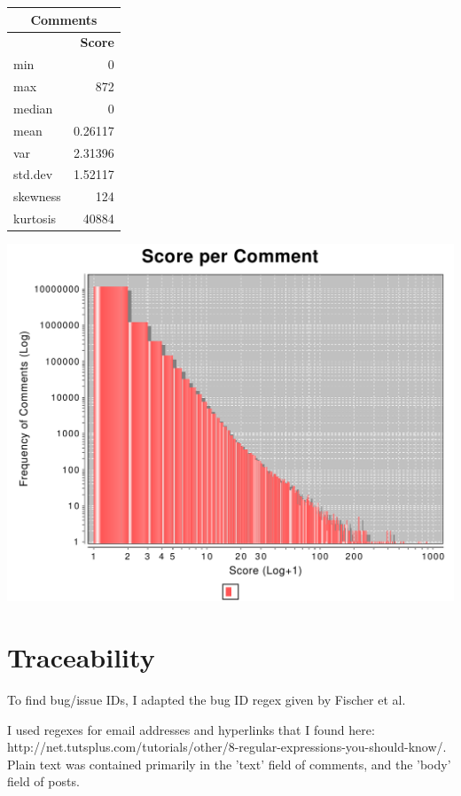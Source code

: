 \documentclass{article}
\begin{document}
\vspace{\baselineskip}

\begin{tabular}[t]{| l | r |} \hline
\multicolumn{2}{|c|}{Comments} \\ \hline
& \bf{Score} \\ \hline 
min       &          0 \\ \hline
max       &        872 \\ \hline
median    &          0 \\ \hline
mean      &          0.26117 \\ \hline
var           &      2.31396 \\ \hline
std.dev        &     1.52117 \\ \hline
skewness & 124 \\ \hline
kurtosis & 40884  \\ \hline
\end{tabular}

\includegraphics[width=\linewidth]{parser/comment-score.pdf}


\section{Traceability}

To find bug/issue IDs, I adapted the bug ID regex given by Fischer et al. \cite{fischer}

I used regexes for email addresses and hyperlinks that I found here: http://net.tutsplus.com/tutorials/other/8-regular-expressions-you-should-know/. Plain text was contained primarily in the 'text' field of comments, and the 'body' field of posts.
\end{document}
